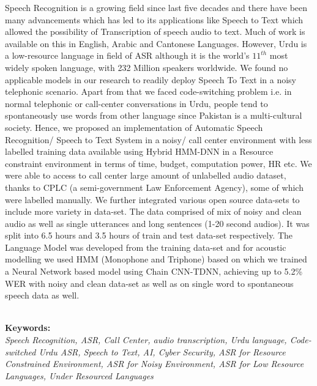 Speech Recognition is a growing field since last five decades and there have been many advancements which has led to its applications like Speech to Text which allowed the possibility of Transcription of speech audio to text. Much of work is available on this in English, Arabic and Cantonese Languages. However, Urdu is a low-resource language in field of ASR although it is the world's $11^{th}$ most widely spoken language, with 232 Million speakers worldwide. We found no applicable models in our research to readily deploy Speech To Text in a noisy telephonic scenario. Apart from that we faced code-switching problem i.e. in normal telephonic or call-center conversations in Urdu, people tend to spontaneously use words from other language since Pakistan is a multi-cultural society. Hence, we proposed an implementation of Automatic Speech Recognition/ Speech to Text System in a noisy/ call center environment with less labelled training data available using Hybrid HMM-DNN in a Resource constraint environment in terms of time, budget, computation power, HR etc. We were able to access to call center large amount of unlabelled audio dataset, thanks to CPLC \cite{cplc_cplc_nodate} (a semi-government Law Enforcement Agency), some of which were labelled manually. We further integrated various open source data-sets to include more variety in data-set. The data comprised of mix of noisy and clean audio as well as single utterances and long sentences (1-20 second audios). It was split into 6.5 hours and 3.5 hours of train and test data-set respectively. The Language Model was developed from the training data-set and for acoustic modelling we used HMM (Monophone and Triphone) based on which we trained a Neural Network based model using Chain CNN-TDNN, achieving up to 5.2\% WER with noisy and clean data-set as well as on single word to spontaneous speech data as well.

\textbf{\\ Keywords:} \textit{\\ Speech Recognition, ASR, Call Center, audio transcription, Urdu language, Code-switched Urdu ASR, Speech to Text, AI, Cyber Security, ASR for Resource Constrained Environment, ASR for Noisy Environment, ASR for Low Resource Languages, Under Resourced Languages}